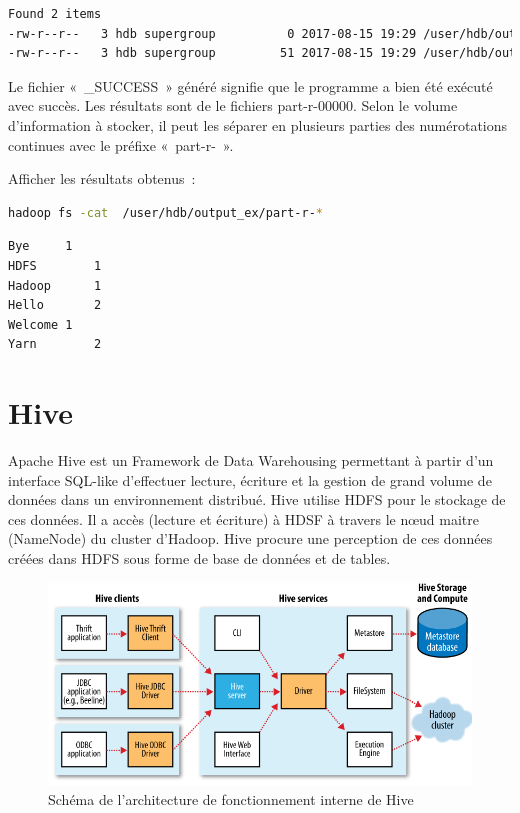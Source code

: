 \documentclass[12pt,english]{book}
\begin{document}
\begin{lstlisting}[language=bash, frame=single]
Found 2 items
-rw-r--r--   3 hdb supergroup          0 2017-08-15 19:29 /user/hdb/output_ex/_SUCCESS
-rw-r--r--   3 hdb supergroup         51 2017-08-15 19:29 /user/hdb/output_ex/part-r-00000
\end{lstlisting}

Le fichier « \_SUCCESS » généré signifie que le programme a bien été exécuté avec succès. Les résultats sont de le fichiers part-r-00000.  Selon le volume d’information à stocker, il peut les séparer en plusieurs parties des numérotations continues avec le préfixe « part-r- ».

Afficher les résultats obtenus :

\begin{lstlisting}[language=bash, frame=single]
hadoop fs -cat  /user/hdb/output_ex/part-r-*
\end{lstlisting}

\begin{lstlisting}[language=bash, frame=single]
Bye		1
HDFS		1
Hadoop		1
Hello		2
Welcome	1
Yarn		2 
\end{lstlisting}

\section{Hive}

Apache Hive est un Framework de Data Warehousing permettant à partir d’un interface SQL-like d’effectuer lecture, écriture et la gestion de grand volume de données dans un environnement distribué. 
Hive utilise HDFS pour le stockage de ces données.
Il a accès (lecture et écriture) à HDSF à travers le nœud maitre (NameNode) du cluster d’Hadoop.
Hive procure une perception de ces données créées dans HDFS sous forme de base de données et de tables.

\begin{figure}[ht]
	\centering
	\includegraphics[width=\linewidth]{hiveSchema}
	\caption[Schéma de l'architecture de fonctionnement interne de Hive]{Schéma de l'architecture de fonctionnement interne de Hive \footnotemark}
\end{figure}
\end{document}
